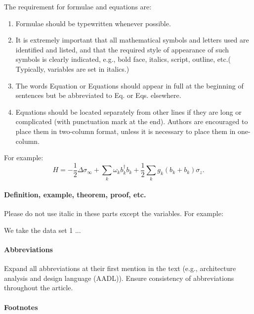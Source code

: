 \documentclass[review]{fcs}
\begin{document}
The requirement for formulae and equations are:
\begin{enumerate}[label=\arabic*)]
\item Formulae should be typewritten whenever possible.
\item It is extremely important that all mathematical symbols and letters used are identified and listed, and that the required style of appearance of such symbols is clearly indicated, e.g., bold face, italics, script, outline, etc.( Typically, variables are set in italics.)
\item The words Equation or Equations should appear in full at the beginning of sentences but be abbreviated to Eq. or Eqs. elsewhere.
\item Equations should be located separately from other lines if they are long or complicated (with punctuation mark at the end). Authors are encouraged to place them in two-column format, unless it is necessary to place them in one-column.
\end{enumerate}

For example:
\begin{equation}H=-\frac{1}{2} \Delta \sigma_{\infty}+\sum_{k} \omega_{k} b_{k}^{\dagger} b_{k}+\frac{1}{2} \sum_{k} g_{k}\left(b_{k}+b_{k}\right) \sigma_{z}.\end{equation}

\paragraph{Definition, example, theorem, proof, etc.}

Please do not use italic in these parts except the variables. For example:

\begin{example}
We take the data set 1 ...
\end{example}

\paragraph{Abbreviations}

Expand all abbreviations at their first mention in the text (e.g., architecture analysis and design language (AADL)). Ensure consistency of abbreviations throughout the article.

\paragraph{Footnotes}
\end{document}
